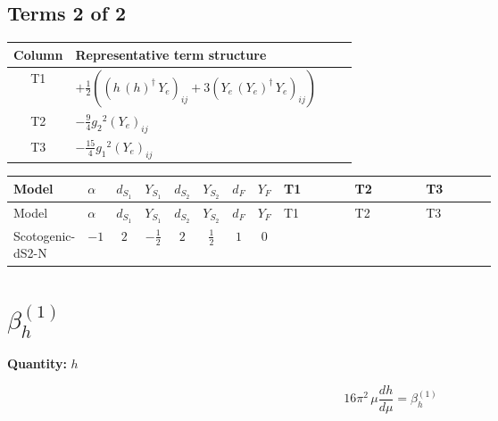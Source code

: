 \documentclass[8pt]{article}
\begin{document}
\begin{landscape}
\subsection*{Terms 2 of 2}
\begin{center}
\begin{tabular}{@{}c >{\raggedright\arraybackslash}p{0.82\linewidth}@{}}
\toprule
Column & Representative term structure \\
\midrule
T1 & \(\displaystyle +\frac{1}{2} (\left({h}\,\left({h}\right)^{\dagger}\,{Y_e}\right)_{ij}+3 \left({Y_e}\,\left({Y_e}\right)^{\dagger}\,{Y_e}\right)_{ij})\) \\
\midrule
T2 & \(\displaystyle -\frac{9}{4} {g_2}^2 \left({Y_e}\right)_{ij}\) \\
\midrule
T3 & \(\displaystyle -\frac{15}{4} {g_1}^2 \left({Y_e}\right)_{ij}\) \\
\midrule
\bottomrule
\end{tabular}
\end{center}
\smallskip
\tiny
\begin{longtable}{@{}llcccccc >{\raggedright\arraybackslash}p{0.21\linewidth} >{\raggedright\arraybackslash}p{0.21\linewidth} >{\raggedright\arraybackslash}p{0.21\linewidth}@{}}
\toprule
Model & $\alpha$ & $d_{S_1}$ & $Y_{S_1}$ & $d_{S_2}$ & $Y_{S_2}$ & $d_F$ & $Y_F$ & T1 & T2 & T3 \\
\midrule
\endfirsthead
\toprule
Model & $\alpha$ & $d_{S_1}$ & $Y_{S_1}$ & $d_{S_2}$ & $Y_{S_2}$ & $d_F$ & $Y_F$ & T1 & T2 & T3 \\
\midrule
\endhead
Scotogenic-dS2-N & $-1$ & $2$ & $-\frac{1}{2}$ & $2$ & $\frac{1}{2}$ & $1$ & $0$ & \scriptsize\adjustbox{max width=\linewidth}{$\begin{gathered} +\frac{1}{2} (\left({h}\,\left({h}\right)^{\dagger}\,{Y_e}\right)_{ij}+3 \left({Y_e}\,\left({Y_e}\right)^{\dagger}\,{Y_e}\right)_{ij})\end{gathered}$} & \scriptsize\adjustbox{max width=\linewidth}{$\begin{gathered} -\frac{9}{4} {g_2}^2 \left({Y_e}\right)_{ij}\end{gathered}$} & \scriptsize\adjustbox{max width=\linewidth}{$\begin{gathered} -\frac{15}{4} {g_1}^2 \left({Y_e}\right)_{ij}\end{gathered}$} \\
\midrule
\bottomrule
\end{longtable}
\clearpage
\section*{$\beta_{h}^{(1)}$}
\noindent\textbf{Quantity: }$h$\par\smallskip
\[16\pi^2\,\mu\frac{d h}{d\mu}=\beta_{h}^{(1)}\]

\end{landscape}
\end{document}
